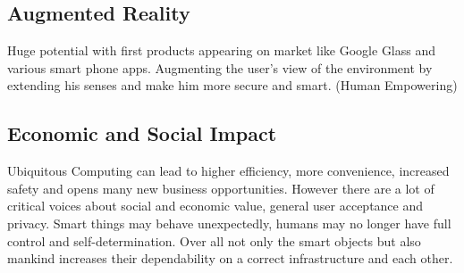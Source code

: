 \documentclass{article}
\begin{document}
\begin{multicols}{2}
\subsection{Augmented Reality}
Huge potential with first products appearing on market like Google Glass and
various smart phone apps. Augmenting the user's view of the environment by
extending his senses and make him more secure and smart. (Human Empowering)

\subsection{Economic and Social Impact}
Ubiquitous Computing can lead to higher efficiency, more convenience,
increased safety and opens many new business opportunities. However there are a
lot of critical voices about social and economic value, general user acceptance
and privacy. Smart things may behave unexpectedly, humans may no longer have
full control and self-determination. Over all not only the smart objects but
also mankind increases their dependability on a correct infrastructure and each
other.




\clearpage
\end{multicols}
\end{document}
